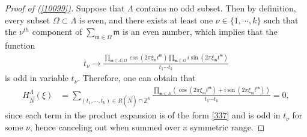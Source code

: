 \documentclass[10pt,a4paper]{amsart}
\numberwithin{equation}{section}
\begin{document}
\begin{proof}[Proof of (\ref{10099})]
	
	Suppose  that $\Lambda$ contains no odd subset. Then by definition, every subset $\Omega\subset \Lambda$ is even, and  there exists at least one $\nu\in \{1,\cdots,k\}$ such that the $\nu^{th}$ component of $  \sum_{\mathfrak{m}\in \Omega} \mathfrak{m}  $ is an even number, which implies that the function
	\begin{align}\label{337}
		t_{\nu}\rightarrow\frac{ \prod_{\mathfrak{m}\in \Lambda\setminus\Omega} \cos(2\pi \xi_{\mathfrak m} t^{\mathfrak{m}}) \prod_{\mathfrak{m}\in \Omega}  i\sin(2\pi \xi_{\mathfrak m} t^{\mathfrak{m}})   }{t_1\cdots t_k}
	\end{align}
	is  odd in variable $t_\nu$.
	Therefore, one can obtain that
	\begin{align*}
		H^{\Lambda}_{\vec{N}}(\xi)
		&=\sum_{(t_1,\cdots,t_k)\in R(\vec{N})\cap   \mathbb{Z}^k} \frac{\prod_{\mathfrak{m}\in \Lambda} \left(\cos (2\pi   \xi_{\mathfrak m}t^{\mathfrak{m}})+i\sin (2\pi \xi_{\mathfrak m}t^{\mathfrak{m}} ) \right) }{t_1\cdots t_k}=0,
	\end{align*}
	since each term in the product expansion is of the form \eqref{337} and is odd in $t_\nu$ for some $\nu$, hence canceling out when summed over a symmetric range.
\end{proof}
\end{document}
